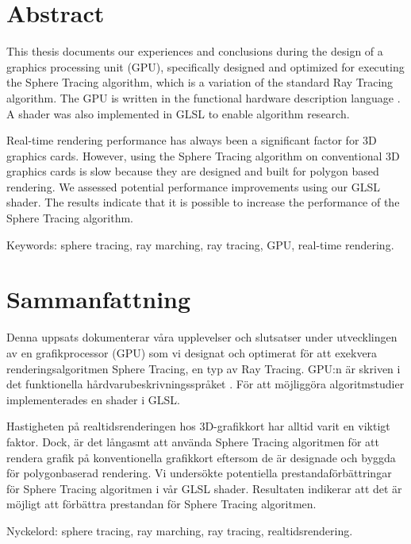 \thispagestyle{plain}			%
\setlength{\parskip}{10pt}
\setlength{\parindent}{0pt}

\section*{Abstract}



	This thesis documents our experiences and conclusions during the design of a
	graphics processing unit (GPU), specifically designed and optimized for
	executing the Sphere Tracing algorithm, which is a variation of the standard
	Ray Tracing algorithm. The GPU is written in the functional hardware description
	language \clash. A shader was also implemented in GLSL to enable
	algorithm research.
	
	Real-time rendering performance has always been a significant factor for 3D
	graphics cards. However, using the Sphere Tracing algorithm on conventional
	3D graphics cards is slow because they are designed and built for polygon
	based rendering. We assessed potential performance improvements using our
	GLSL shader. The results indicate that it is possible to increase the
	performance of the Sphere Tracing algorithm.

	\vfill Keywords: sphere tracing, ray marching, ray tracing, GPU, real-time
	rendering.

\newpage
\thispagestyle{plain}

\section*{Sammanfattning}
	
	Denna uppsats dokumenterar våra upplevelser och slutsatser under 
	utvecklingen av en grafikprocessor (GPU) som vi	designat och optimerat 
	för att exekvera renderingsalgoritmen Sphere Tracing, en typ av Ray 
	Tracing. GPU:n är skriven i det funktionella hårdvarubeskrivningsspråket 
	\clash. För att möjliggöra algoritmstudier implementerades en shader i GLSL.
	
	Hastigheten på realtidsrenderingen hos 3D-grafikkort har alltid varit en
	viktigt faktor. Dock, är det långasmt att använda Sphere Tracing algoritmen
	för att rendera grafik på konventionella grafikkort eftersom de är designade
	och byggda för polygonbaserad rendering. Vi undersökte potentiella
	prestandaförbättringar för Sphere Tracing algoritmen i vår GLSL shader.
	Resultaten indikerar att det är möjligt att förbättra prestandan för Sphere
	Tracing algoritmen.

	\vfill
	Nyckelord: sphere tracing, ray marching, ray tracing, realtidsrendering.


\newpage
\thispagestyle{empty}
\mbox{}

